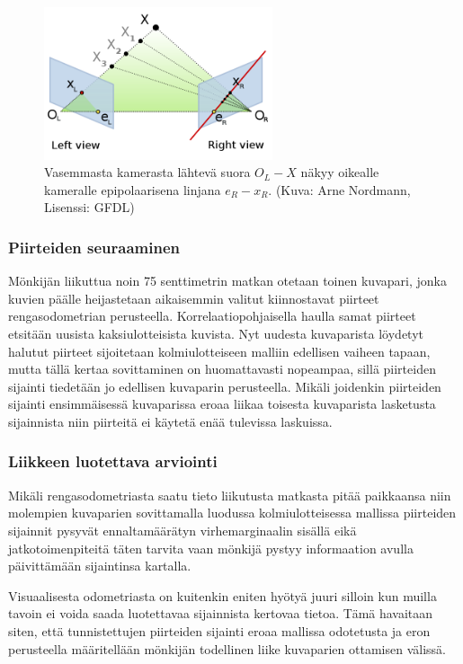 \documentclass[finnish]{tktltiki2}
\theoremstyle{definition}
\theoremstyle{remark}
\begin{document}
\begin{figure}[h!]
	\caption{Vasemmasta kamerasta lähtevä suora $O_L-X$ näkyy oikealle kameralle epipolaarisena linjana $e_R-x_R$. (Kuva: Arne Nordmann, Lisenssi: GFDL)}
	\centering
		\includegraphics[width=0.6\textwidth]{epipolar_geometry}
\end{figure}

\subsubsection{Piirteiden seuraaminen}
Mönkijän liikuttua noin 75 senttimetrin matkan otetaan toinen kuvapari, jonka kuvien päälle heijastetaan aikaisemmin valitut kiinnostavat piirteet rengasodometrian perusteella. Korrelaatiopohjaisella haulla samat piirteet etsitään uusista kaksiulotteisista kuvista. Nyt uudesta kuvaparista löydetyt halutut piirteet sijoitetaan kolmiulotteiseen malliin edellisen vaiheen tapaan, mutta tällä kertaa sovittaminen on huomattavasti nopeampaa, sillä piirteiden sijainti tiedetään jo edellisen kuvaparin perusteella. Mikäli joidenkin piirteiden sijainti ensimmäisessä kuvaparissa eroaa liikaa toisesta kuvaparista lasketusta sijainnista niin piirteitä ei käytetä enää tulevissa laskuissa.\cite{cheng2005visual}

\subsubsection{Liikkeen luotettava arviointi}
Mikäli rengasodometriasta saatu tieto liikutusta matkasta pitää paikkaansa niin molempien kuvaparien sovittamalla luodussa kolmiulotteisessa mallissa piirteiden sijainnit pysyvät ennaltamäärätyn virhemarginaalin sisällä eikä jatkotoimenpiteitä täten tarvita vaan mönkijä pystyy informaation avulla päivittämään sijaintinsa kartalla. 

Visuaalisesta odometriasta on kuitenkin eniten hyötyä juuri silloin kun muilla tavoin ei voida saada luotettavaa sijainnista kertovaa tietoa. Tämä havaitaan siten, että tunnistettujen piirteiden sijainti eroaa mallissa odotetusta ja eron perusteella määritellään mönkijän todellinen liike kuvaparien ottamisen välissä.
\end{document}
